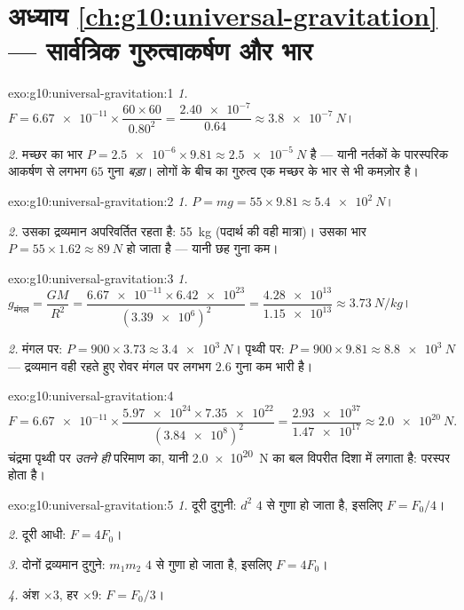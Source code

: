 \section*{अध्याय \ref{ch:g10:universal-gravitation} --- सार्वत्रिक गुरुत्वाकर्षण और भार}

\begin{solution}{exo:g10:universal-gravitation:1}
\emph{1.} $F = \num{6.67e-11} \times \dfrac{60 \times 60}{0.80^2}
= \dfrac{\num{2.40e-7}}{0.64} \approx \qty{3.8e-7}{N}$।

\emph{2.} मच्छर का भार $P = \num{2.5e-6} \times 9.81 \approx \qty{2.5e-5}{N}$ है --- यानी नर्तकों के पारस्परिक
आकर्षण से लगभग $65$ गुना \emph{बड़ा}। लोगों के बीच का गुरुत्व एक मच्छर
के भार से भी कमज़ोर है।
\end{solution}

\begin{solution}{exo:g10:universal-gravitation:2}
\emph{1.} $P = mg = 55 \times 9.81 \approx \qty{5.4e2}{N}$।

\emph{2.} उसका द्रव्यमान अपरिवर्तित रहता है: \qty{55}{kg} (पदार्थ की वही
मात्रा)। उसका भार $P = 55 \times 1.62 \approx \qty{89}{N}$ हो जाता है --- यानी छह गुना कम।
\end{solution}

\begin{solution}{exo:g10:universal-gravitation:3}
\emph{1.} $g_{\text{मंगल}} = \dfrac{G M}{R^2}
= \dfrac{\num{6.67e-11} \times \num{6.42e23}}{(\num{3.39e6})^2}
= \dfrac{\num{4.28e13}}{\num{1.15e13}} \approx \qty{3.73}{N/kg}$।

\emph{2.} मंगल पर: $P = 900 \times 3.73 \approx \qty{3.4e3}{N}$। पृथ्वी पर: $P = 900 \times 9.81 \approx \qty{8.8e3}{N}$ --- द्रव्यमान वही रहते हुए
रोवर मंगल पर लगभग $2.6$ गुना कम भारी है।
\end{solution}

\begin{solution}{exo:g10:universal-gravitation:4}
\[
F = \num{6.67e-11} \times
\frac{\num{5.97e24} \times \num{7.35e22}}{(\num{3.84e8})^2}
= \frac{\num{2.93e37}}{\num{1.47e17}}
\approx \qty{2.0e20}{N}.
\]
चंद्रमा पृथ्वी पर \emph{उतने ही} परिमाण का, यानी \qty{2.0e20}{N} का बल विपरीत
दिशा में लगाता है:  परस्पर होता है।
\end{solution}

\begin{solution}{exo:g10:universal-gravitation:5}
\emph{1.} दूरी दुगुनी: $d^2$ $4$ से गुणा हो जाता है, इसलिए $F = F_0/4$।

\emph{2.} दूरी आधी: $F = 4F_0$।

\emph{3.} दोनों द्रव्यमान दुगुने: $m_1 m_2$ $4$ से गुणा हो जाता है,
इसलिए $F = 4F_0$।

\emph{4.} अंश $\times 3$, हर $\times 9$: $F = F_0/3$।
\end{solution}

